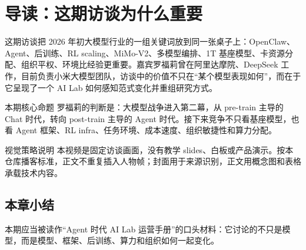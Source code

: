 \section{导读：这期访谈为什么重要}

这期访谈把 2026 年初大模型行业的一组关键词放到同一张桌子上：OpenClaw、Agent、后训练、RL scaling、MiMo-V2、多模型编排、1T 基座模型、卡资源分配、组织平权、环境比经验更重要。嘉宾罗福莉曾在阿里达摩院、DeepSeek 工作，目前负责小米大模型团队，访谈中的价值不只在“某个模型表现如何”，而在于它呈现了一个 AI Lab 如何感知范式变化并重组研究方式。

\begin{importantbox}{本期核心命题}
罗福莉的判断是：大模型战争进入第二幕，从 pre-train 主导的 Chat 时代，转向 post-train 主导的 Agent 时代。接下来竞争不只看基座模型，也看 Agent 框架、RL infra、任务环境、成本速度、组织敏捷性和算力分配。
\end{importantbox}

\begin{knowledgebox}{视觉策略说明}
本视频是固定访谈画面，没有教学 slides、白板或产品演示。按本仓库播客标准，正文不重复插入人物帧；封面用于来源识别，正文用概念图和表格承载技术内容。
\end{knowledgebox}

\subsection{本章小结}

本期应当被读作“Agent 时代 AI Lab 运营手册”的口头材料：它讨论的不只是模型，而是模型、框架、后训练、算力和组织如何一起变化。

